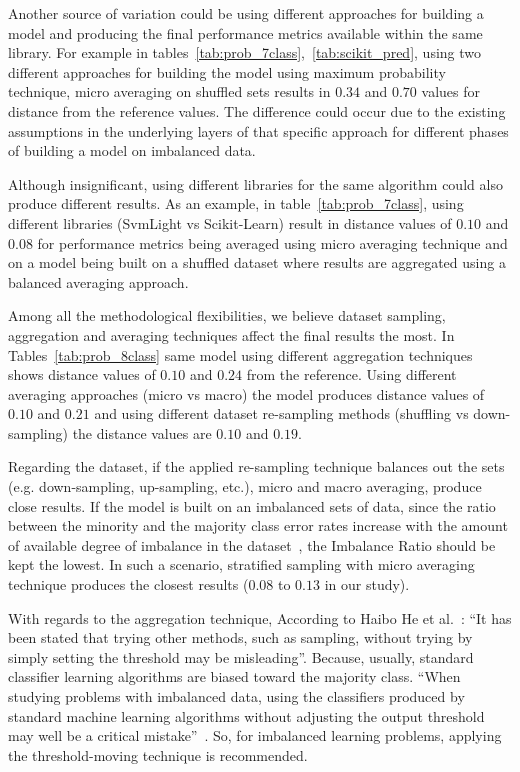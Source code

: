 Another source of variation could be using different approaches for building a model and 
producing the final performance metrics available within the same library. For example in  
tables~\ref{tab:prob_7class},~\ref{tab:scikit_pred}, using two different approaches for building 
the model using maximum probability technique, micro averaging on shuffled sets results in $0.34$ 
and $0.70$ values for distance from the reference values. The difference could occur due to the 
existing assumptions in the underlying layers of that specific approach for different phases of 
building a model on imbalanced data. 

Although insignificant, using different libraries for the same algorithm could also produce 
different results. As an example, in table~\ref{tab:prob_7class}, using different libraries 
(SvmLight vs Scikit-Learn) result in distance values of $0.10$ and $0.08$ for performance metrics 
being averaged using micro averaging technique and on a model being built on a shuffled dataset 
where results are aggregated using a balanced averaging approach.

Among all the methodological flexibilities, we believe dataset sampling, aggregation and 
averaging techniques affect the final results the most. In Tables~\ref{tab:prob_8class} 
same model using different aggregation techniques shows distance values of $0.10$ and $0.24$ 
from the reference. Using different averaging approaches (micro vs macro) the model produces 
distance values of $0.10$ and $0.21$ and using different dataset re-sampling methods 
(shuffling vs down-sampling) the distance values are $0.10$ and $0.19$.

Regarding the dataset, if the applied re-sampling technique balances out the sets 
(e.g. down-sampling, up-sampling, etc.), micro and macro averaging, produce close results. 
If the model is built on an imbalanced sets of data, since the ratio between the minority and the 
majority class error rates increase with the amount of available degree of imbalance 
in the dataset~\cite{japkowicz_concept-learning_2001}, the Imbalance Ratio should be kept the lowest. 
In such a scenario, stratified sampling with micro averaging technique produces the closest results 
($0.08$ to $0.13$ in our study). 

With regards to the aggregation technique, According to Haibo He et al.~\cite{haibo_he_learning_2009}: 
“It has been stated that trying other methods, such as sampling, without trying by simply setting the 
threshold may be misleading”. Because, usually, standard classifier learning algorithms are 
biased toward the majority class. “When studying problems with imbalanced data, using the 
classifiers produced by standard machine learning algorithms without adjusting the output 
threshold may well be a critical mistake”~\cite{provost_machine_2000}. So, for imbalanced 
learning problems, applying the threshold-moving technique is recommended. 

